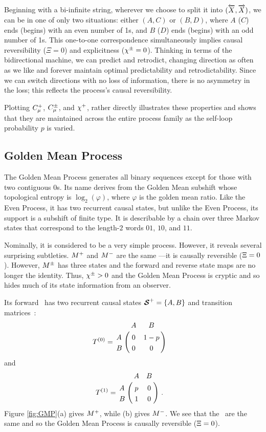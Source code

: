 Beginning with a bi-infinite string, wherever we choose to split it into
$(\overleftarrow {{X}}, \overrightarrow{{X}})$, we can be in one of only two situations: either
$(A,C)$ or $(B,D)$,
where $A$ ($C$) ends (begins) with an even number of 1s, and $B$ ($D$) ends
(begins) with an odd number of 1s. This one-to-one correspondence
simultaneously implies causal reversibility ($\Xi = 0$) and explicitness
($\chi^\pm = 0$). Thinking in terms of the bidirectional
machine, we can predict and retrodict, changing direction as often as we like 
and forever maintain optimal predictability and retrodictability. Since we can 
switch directions with no loss of information, there is no asymmetry in the
loss; this reflects the process's causal reversibility.

Plotting $C_\mu^{+}$, $C_\mu^{\pm}$, and $\chi^+$,  rather
directly illustrates these properties and shows that they are maintained
across the entire process family as the self-loop probability $p$ is varied.

\subsection{Golden Mean Process}

The Golden Mean Process generates all binary sequences except for those with
two contiguous $0$s. Its name derives from the Golden Mean subshift whose
topological entropy is $\log_2(\varphi)$, where $\varphi$ is the golden mean 
ratio. Like the Even Process, it has two recurrent causal states, but 
unlike the Even Process, its support is a subshift of finite type.
It is describable by a chain over three Markov states that correspond to the 
length-$2$ words $01$, $10$, and $11$. 

Nominally, it is considered to be a 
very simple process.
However, it reveals several surprising subtleties. ${M}^{+}$ and ${M}^{-}$
are the same \eM---it is causally reversible ($\Xi=0$). However, ${M}^{\pm}$ has three
states and the forward and reverse state maps are no longer the identity. Thus,
$\chi^\pm > 0$ and the Golden Mean Process is cryptic and so hides much of its
state information from an observer.

Its forward \eM\ has two recurrent causal states
${\boldsymbol{\mathcal{S}}}^{+} = \{ A, B \}$ and transition matrices~\cite{Crut01a}:
\begin{align*}
T^{(0)} &=
  \bordermatrix{%
      & A & B \cr
    A & 0 & 1-p \cr
    B & 0   & 0
  }
\end{align*}
and
\begin{align*}
T^{(1)} &=
  \bordermatrix{%
      & A   & B \cr
    A & p & 0 \cr
    B & 1 & 0
  } ~.
\end{align*}
Figure \ref{fig:GMP}(a) gives ${M}^{+}$, while (b) gives ${M}^{-}$. We
see that the \eMs\ are the same and so the Golden Mean Process is causally
reversible ($\Xi = 0$).

